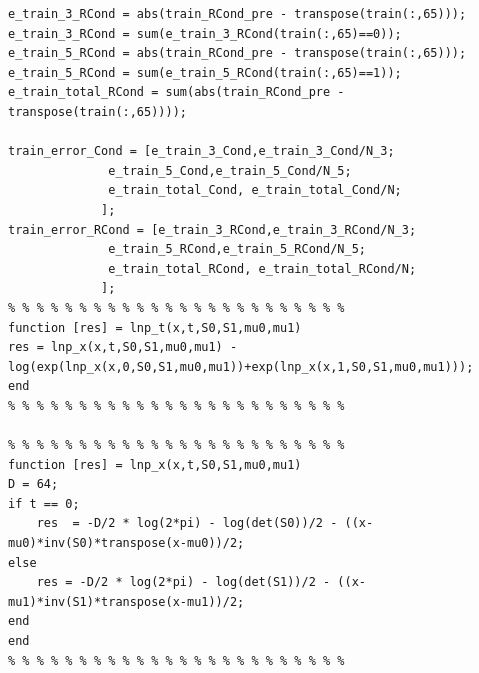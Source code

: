 \documentclass[12pt]{article}
\begin{document}
\begin{verbatim}
e_train_3_RCond = abs(train_RCond_pre - transpose(train(:,65)));
e_train_3_RCond = sum(e_train_3_RCond(train(:,65)==0));
e_train_5_RCond = abs(train_RCond_pre - transpose(train(:,65)));
e_train_5_RCond = sum(e_train_5_RCond(train(:,65)==1));
e_train_total_RCond = sum(abs(train_RCond_pre - transpose(train(:,65))));

train_error_Cond = [e_train_3_Cond,e_train_3_Cond/N_3;
              e_train_5_Cond,e_train_5_Cond/N_5;
              e_train_total_Cond, e_train_total_Cond/N;
             ];
train_error_RCond = [e_train_3_RCond,e_train_3_RCond/N_3;
              e_train_5_RCond,e_train_5_RCond/N_5;
              e_train_total_RCond, e_train_total_RCond/N;
             ];
% % % % % % % % % % % % % % % % % % % % % % % %
function [res] = lnp_t(x,t,S0,S1,mu0,mu1)
res = lnp_x(x,t,S0,S1,mu0,mu1) -log(exp(lnp_x(x,0,S0,S1,mu0,mu1))+exp(lnp_x(x,1,S0,S1,mu0,mu1)));
end
% % % % % % % % % % % % % % % % % % % % % % % % 

% % % % % % % % % % % % % % % % % % % % % % % %
function [res] = lnp_x(x,t,S0,S1,mu0,mu1)
D = 64;
if t == 0;
    res  = -D/2 * log(2*pi) - log(det(S0))/2 - ((x-mu0)*inv(S0)*transpose(x-mu0))/2;
else    
    res = -D/2 * log(2*pi) - log(det(S1))/2 - ((x-mu1)*inv(S1)*transpose(x-mu1))/2;
end
end
% % % % % % % % % % % % % % % % % % % % % % % % 



\end{verbatim}
\end{document}
